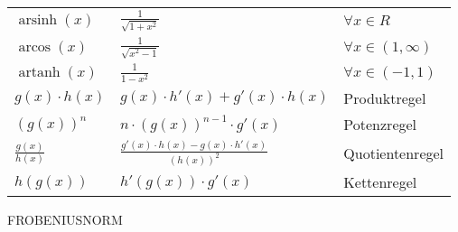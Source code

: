 \documentclass{sciposter}
\begin{document}
\begin{multicols}{2}
{\begin{table}[]
\begin{tabular}{@{} p{} p{} p{} @{}}
			$\operatorname{arsinh}(x)$ & $\frac{1}{\sqrt{1+x^2}}$ & $\forall x \in R$\\
			$\operatorname{arcos}(x)$ & $\frac{1}{\sqrt{x^2 - 1}}$ & $\forall x \in (1, \infty)$\\		  $\operatorname{artanh}(x)$ & $\frac{1}{1-x^2}$ & $\forall x \in (-1,1)$\\
			\midrule
			$g(x) \cdot h(x)$ & $g(x) \cdot h'(x) + g'(x) \cdot h(x)$ & Produktregel\\
			$\left(g(x)\right)^n$ & $n \cdot \left( g(x) \right)^{n-1} \cdot g'(x)$ & Potenzregel\\
			$\frac{g(x)}{h(x)}$ & $\frac{ g'(x) \cdot h(x) - g(x)\cdot h'(x)}{\left(h(x)\right) ^2}$ & Quotientenregel\\
			$h(g(x))$ & $h'(g(x)) \cdot g'(x)$ & Kettenregel\\
			\bottomrule
		\end{tabular}
	\end{table}
}





FROBENIUSNORM


\vfill\null
\columnbreak



\end{multicols}
\end{document}
